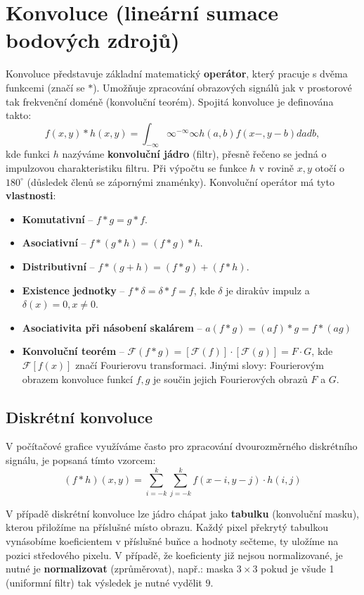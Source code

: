 \section{Konvoluce (lineární sumace bodových zdrojů)}
Konvoluce představuje základní matematický \textbf{operátor}, který pracuje s dvěma funkcemi (značí se $*$). Umožňuje zpracování obrazových signálů jak v prostorové tak frekvenční doméně (konvoluční teorém). Spojitá konvoluce je definována takto:
\begin{equation*}
    f(x, y) * h(x, y) = \int_{-\infty}{\infty}^{-\infty}{\infty} h(a, b) f(x - , y - b)dadb,
\end{equation*}
kde funkci $h$ nazýváme \textbf{konvoluční jádro} (filtr), přesně řečeno se jedná o impulzovou charakteristiku filtru. Při výpočtu se funkce $h$ v rovině $x, y$ otočí o $180^\circ$ (důsledek členů se zápornými znaménky). Konvoluční operátor má tyto \textbf{vlastnosti}:
\begin{itemize}
    \item \textbf{Komutativní} -- $f * g = g * f$.
    \item \textbf{Asociativní} -- $f * (g * h) = (f * g) * h$.
    \item \textbf{Distributivní} -- $f * (g + h) = (f * g) + (f * h)$.
    \item \textbf{Existence jednotky} -- $f * \delta = \delta * f = f$, kde $\delta$ je dirakův impulz a $\delta(x) = 0, x \neq 0$.
    \item \textbf{Asociativita při násobení skalárem} -- $a(f * g) = (af) * g = f * (ag)$
    \item \textbf{Konvoluční teorém} -- $\mathcal{F}(f * g) = [\mathcal{F}(f)] \cdot [\mathcal{F}(g)] = F \cdot G$, kde $\mathcal{F}[f(x)]$ značí Fourierovu transformaci. Jinými slovy: Fourierovým obrazem konvoluce funkcí $f, g$ je součin jejich Fourierových obrazů $F$ a $G$.
\end{itemize}

\subsection{Diskrétní konvoluce}
V počítačové grafice využíváme často pro zpracování dvourozměrného diskrétního signálu, je popsaná tímto vzorcem:
\begin{equation*}
    (f*h)(x,y)=\sum _{{i=-k}}^{k}\sum _{{j=-k}}^{k}f(x-i,y-j)\cdot h(i,j)
\end{equation*}

V případě diskrétní konvoluce lze jádro chápat jako \textbf{tabulku} (konvoluční masku), kterou přiložíme na příslušné místo obrazu. Každý pixel překrytý tabulkou vynásobíme koeficientem v příslušné buňce a hodnoty sečteme, ty uložíme na pozici středového pixelu. V případě, že koeficienty již nejsou normalizované, je nutné je \textbf{normalizovat} (zprůměrovat), např.: maska $3 \times 3$ pokud je všude 1 (uniformní filtr) tak výsledek je nutné vydělit $9$.

